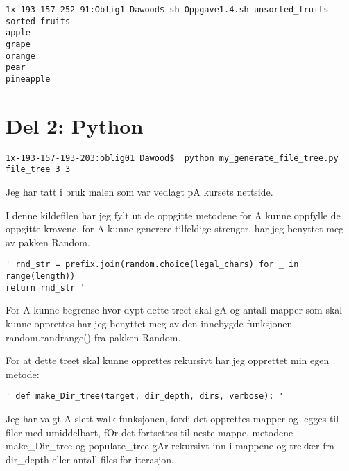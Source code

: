 \documentclass{article}
\begin{document}
\begin{Verbatim}
1x-193-157-252-91:Oblig1 Dawood$ sh Oppgave1.4.sh unsorted_fruits sorted_fruits
apple
grape
orange
pear
pineapple
\end{Verbatim}





\section*{Del 2: Python}

\begin{Verbatim}
1x-193-157-193-203:oblig01 Dawood$  python my_generate_file_tree.py file_tree 3 3
\end{Verbatim}
Jeg har tatt i bruk malen som var vedlagt pA kursets nettside.

I denne kildefilen har jeg fylt ut de oppgitte metodene for A kunne oppfylle de oppgitte kravene.
for A kunne generere tilfeldige strenger, har jeg benyttet meg av pakken Random.

\begin{Verbatim}
' rnd_str = prefix.join(random.choice(legal_chars) for _ in range(length))
return rnd_str '
\end{Verbatim}

For A kunne begrense hvor dypt dette treet skal gA og antall mapper som skal kunne opprettes
har jeg benyttet meg av den innebygde funksjonen random.randrange() fra pakken Random.

For at dette treet skal kunne opprettes rekursivt har jeg opprettet min egen metode:
\begin{Verbatim}
' def make_Dir_tree(target, dir_depth, dirs, verbose): '
\end{Verbatim}
Jeg har valgt A slett walk funksjonen, fordi det opprettes mapper og legges
til filer med umiddelbart, fOr det fortsettes til neste mappe.
metodene make\_Dir\_tree og populate\_tree gAr rekursivt inn i mappene og trekker fra dir\_depth eller antall files for iterasjon.
\end{document}
